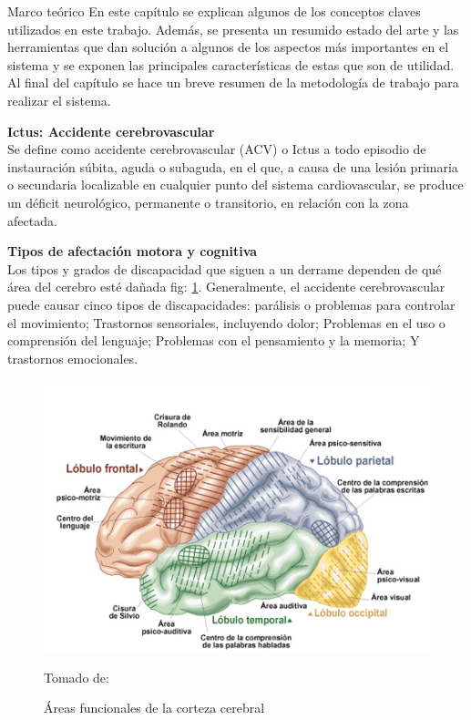 \begin{thesischapter}{1} {Marco teórico}
    En este capítulo se explican algunos de los conceptos claves utilizados en este
    trabajo. Además, se presenta un resumido estado del arte y las herramientas que
    dan solución a algunos de los aspectos más importantes en el sistema y se exponen
    las principales características de estas que son de utilidad. Al final del capítulo se
    hace un breve resumen de la metodología de trabajo para realizar el sistema.


    \vspace{10pt}
    \textbf{Ictus: Accidente cerebrovascular}\\
    Se define como accidente cerebrovascular (ACV) o Ictus a todo episodio de
    instauración súbita, aguda o subaguda, en el que, a causa de una lesión primaria o
    secundaria localizable en cualquier punto del sistema cardiovascular, se produce un
    déficit neurológico, permanente o transitorio, en relación con la zona afectada.~\cite{ictus}

    \vspace{10pt}
    \textbf{Tipos de afectación motora y cognitiva}\\
    Los tipos y grados de discapacidad que siguen a un derrame dependen de qué área
    del cerebro esté dañada fig: \ref{fig: cerebralcortex}. Generalmente, el accidente cerebrovascular puede
    causar cinco tipos de discapacidades: parálisis o problemas para controlar el movimiento;
    Trastornos sensoriales, incluyendo dolor; Problemas en el uso o comprensión del
    lenguaje; Problemas con el pensamiento y la memoria; Y trastornos emocionales.~\cite{post-strok} 
    \begin{figure}[ht]
        \centering
        \includegraphics[scale=0.5]{images/brain.jpg}
        \caption{Áreas funcionales de la corteza cerebral}
        Tomado de: ~\cite{areacereabral}
        \label{fig: cerebralcortex}
    \end{figure}


\end{thesischapter}
